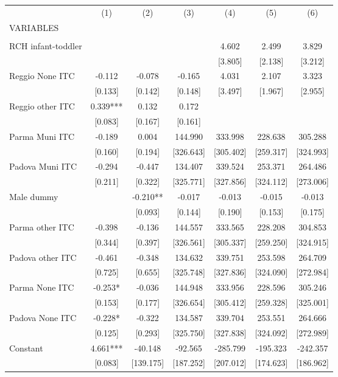 \begin{tabular}{lcccccc} \hline
 & (1) & (2) & (3) & (4) & (5) & (6) \\
VARIABLES &  &  &  &  &  &  \\ \hline
 &  &  &  &  &  &  \\
RCH infant-toddler &  &  &  & 4.602 & 2.499 & 3.829 \\
 &  &  &  & [3.805] & [2.138] & [3.212] \\
Reggio None ITC & -0.112 & -0.078 & -0.165 & 4.031 & 2.107 & 3.323 \\
 & [0.133] & [0.142] & [0.148] & [3.497] & [1.967] & [2.955] \\
Reggio other ITC & 0.339*** & 0.132 & 0.172 &  &  &  \\
 & [0.083] & [0.167] & [0.161] &  &  &  \\
Parma Muni ITC & -0.189 & 0.004 & 144.990 & 333.998 & 228.638 & 305.288 \\
 & [0.160] & [0.194] & [326.643] & [305.402] & [259.317] & [324.993] \\
Padova Muni ITC & -0.294 & -0.447 & 134.407 & 339.524 & 253.371 & 264.486 \\
 & [0.211] & [0.322] & [325.771] & [327.856] & [324.112] & [273.006] \\
Male dummy &  & -0.210** & -0.017 & -0.013 & -0.015 & -0.013 \\
 &  & [0.093] & [0.144] & [0.190] & [0.153] & [0.175] \\
Parma other ITC & -0.398 & -0.136 & 144.557 & 333.565 & 228.208 & 304.853 \\
 & [0.344] & [0.397] & [326.561] & [305.337] & [259.250] & [324.915] \\
Padova other ITC & -0.461 & -0.348 & 134.632 & 339.751 & 253.598 & 264.709 \\
 & [0.725] & [0.655] & [325.748] & [327.836] & [324.090] & [272.984] \\
Parma None ITC & -0.253* & -0.036 & 144.948 & 333.956 & 228.596 & 305.246 \\
 & [0.153] & [0.177] & [326.654] & [305.412] & [259.328] & [325.001] \\
Padova None ITC & -0.228* & -0.322 & 134.587 & 339.704 & 253.551 & 264.666 \\
 & [0.125] & [0.293] & [325.750] & [327.838] & [324.092] & [272.989] \\
Constant & 4.661*** & -40.148 & -92.565 & -285.799 & -195.323 & -242.357 \\
 & [0.083] & [139.175] & [187.252] & [207.012] & [174.623] & [186.962] \\

\end{tabular}
